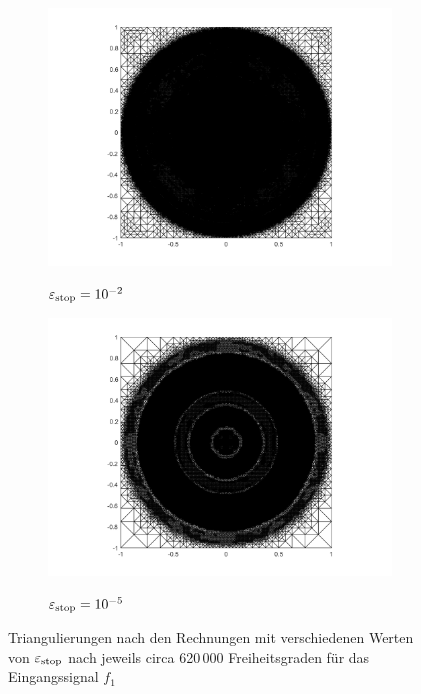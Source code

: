 \begin{figure}[p]
  \centering
  \begin{subfigure}[b]{.48\linewidth}
    \centering
    \caption{$\varepsilon_{\textup{stop}}=10^{-2}$}
    \includegraphics[trim = 100 30 80 20, clip, width=\linewidth]
      {pictures/chapExperiments/secParameters/parEpsStop/f01/1eM2/lvl15/triangulation.png}
    \label{fig:triangEpsStop1em2}
  \end{subfigure}
  \quad
  \begin{subfigure}[b]{.48\linewidth}
    \centering
    \caption{$\varepsilon_{\textup{stop}}=10^{-5}$}
    \includegraphics[trim = 100 30 80 20, clip, width=\linewidth]
      {pictures/chapExperiments/secParameters/parEpsStop/f01/1eM5/lvl14/triangulation.png}
    \label{fig:triangEpsStop1em5}
  \end{subfigure}
  \caption{Triangulierungen nach den Rechnungen mit verschiedenen Werten von
    $\varepsilon_{\textup{stop}}$ nach jeweils circa 620\,000 Freiheitsgraden für das
    Eingangssignal $f_1$}
  \label{fig:triangEpsStop}
\end{figure}
